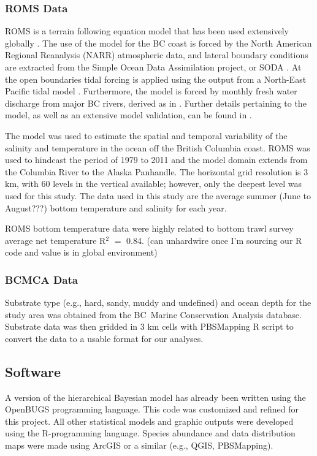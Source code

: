 \documentclass[11pt]{book}\usepackage[]{graphicx}\usepackage[]{color}
\newcommand{\bc}{BC}
\begin{document}
\subsubsection{ROMS Data}
ROMS is a terrain following equation model that has been used extensively globally \citep{haid08}. The use of the model for the BC coast is forced by the North American Regional Reanalysis (NARR) \citep{narr04} atmospheric data, and lateral boundary conditions are extracted from the Simple Ocean Data Assimilation project, or SODA \citep{cart08}. At the open boundaries tidal forcing is applied using the output from a North-East Pacific tidal model \citep{fore00}. Furthermore, the model is forced by monthly fresh water discharge from major BC rivers, derived as in \citet{morr12}. Further details pertaining to the model, as well as an extensive model validation, can be found in \citet{mf12}.

The model was used to estimate the spatial and temporal variability of the salinity and temperature in the ocean off the British Columbia coast. ROMS was used to hindcast the period of 1979 to 2011 and the model domain extends from the Columbia River to the Alaska Panhandle.   The horizontal grid resolution is 3 km, with 60 levels in the vertical available; however, only the deepest level was used for this study. The data used in this study are the average summer (June to August???) bottom temperature and salinity for each year.

ROMS bottom temperature data were highly related to bottom trawl survey average net temperature R$^2$ $=$ 0.84. (can unhardwire once I'm sourcing our R code and value is in global environment)

\subsubsection{BCMCA Data}
Substrate type (e.g., hard, sandy, muddy and undefined) and ocean depth for the study area was obtained from the \bc\ Marine Conservation Analysis database. Substrate data was then gridded in 3 km cells with PBSMapping R script to convert the data to a usable format for our analyses.

\subsection{Software}
A version of the hierarchical Bayesian model has already been written using the OpenBUGS programming language. This code was customized and refined for this project. All other statistical models and graphic outputs were developed using the R-programming language. Species abundance and data distribution maps were made using ArcGIS or a similar (e.g., QGIS, PBSMapping).
\end{document}
